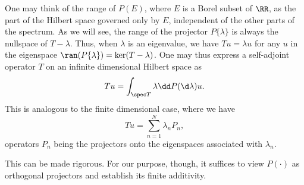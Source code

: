 \documentclass[oneside,reqno,letterpaper]{amsart}
\begin{document}
One may think of the range of \(P(E)\), where \(E\) is a Borel subset of \(\RR\), as the part of the Hilbert space governed only by \(E\), independent of the other parts of the spectrum.
As we will see, the range of the projector \(P \{\lambda\}\) is always the nullspace of \(T - \lambda\). 
Thus, when \(\lambda\) is an eigenvalue, we have \(T u = \lambda u\) for any \(u\) in the eigenspace \(\ran(P \{\lambda\}) = \ker(T - \lambda)\). 
One may thus express a self-adjoint operator \(T\) on an infinite dimensional Hilbert space as 
\[
  Tu = \int_{\spec T} \lambda \dd P(\d\lambda) u . 
\] 
This is analogous to the finite dimensional case, where we have 
\[
  T u = \sum_{n=1}^{N} \lambda_n P_n , 
\] 
operators \(P_n\) being the projectors onto the eigenspaces associated with \(\lambda_n\). 


This can be made rigorous. 
For our purpose, though, it suffices to view \(P(\cdot)\) as orthogonal projectors and establish its finite additivity.
\end{document}
